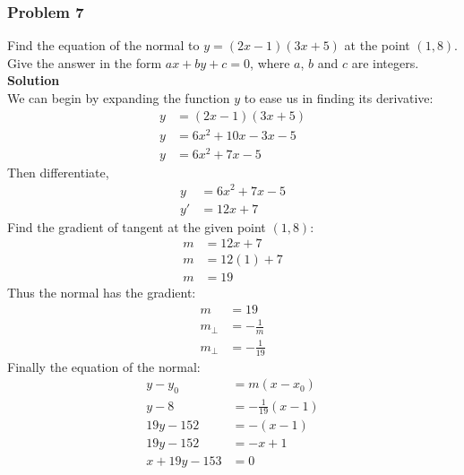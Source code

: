 \documentclass[hidelinks, a4paper, 12pt]{article}
\newcommand{\bd}{\textbf}
\newcommand{\n}{\\[\baselineskip]}
\begin{document}
            \subsubsection{Problem 7}
                Find the equation of the normal to $y = (2x-1)(3x+5)$ at the point $(1,8)$. Give the answer in the form $ax + by + c = 0$,
                where $a$, $b$ and $c$ are integers.\n
                \bd{Solution}\n
                We can begin by expanding the function $y$ to ease us in finding its derivative:
                \[\begin{split}
                    y &= (2x-1)(3x+5)\\
                    y &= 6x^2 + 10x - 3x - 5\\
                    y &= 6x^2 + 7x - 5
                \end{split}\]
                Then differentiate,
                \[\begin{split}
                    y &= 6x^2 + 7x - 5\\
                    y' &= 12x + 7
                \end{split}\]
                Find the gradient of tangent at the given point $(1,8)$:
                \[\begin{split}
                    m &= 12x + 7\\
                    m &= 12(1) + 7\\
                    m &= 19
                \end{split}\]
                Thus the normal has the gradient:
                \[\begin{split}
                    m &= 19\\
                    m_\perp &= -\frac{1}{m}\\
                    m_\perp &= -\frac{1}{19}
                \end{split}\]
                Finally the equation of the normal:
                \[\begin{split}
                    y - y_0 &= m(x-x_0)\\
                    y - 8 &= -\frac{1}{19}(x-1)\\
                    19y - 152 &= -(x-1)\\
                    19y - 152 &= -x + 1\\
                    x + 19y - 153 &= 0
                \end{split}\]
    
    
\end{document}
